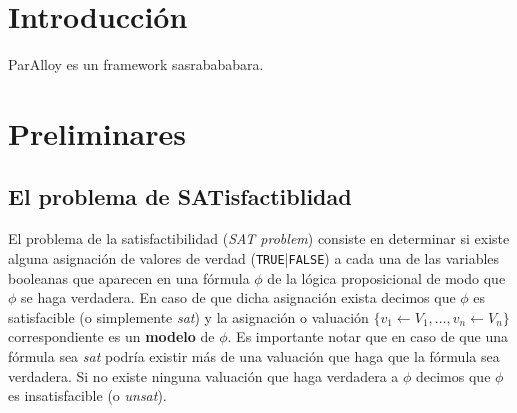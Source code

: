 \documentclass[a4paper, 11pt, twoside]{tesis}
\begin{document}
\def\autor{Ignacio Vissani}
\def\titulo{Acelerando ParAlloy mediante la reutilización de cláusulas
aprendidas} 
\def\runtitulo{Acelerando ParAlloy mediante la reutilización de cláusulas
aprendidas}
\def\runtitle{Speeding up ParAlloy reusing learnt clauses}
\def\director{Carlos Gustavo López Pombo}
\def\codirector{Nicolás Leandro Rosner}
\def\lugar{Buenos Aires, 2012}


\frontmatter
\pagestyle{empty}


\cleardoublepage


\cleardoublepage

\cleardoublepage

\cleardoublepage
\tableofcontents

\mainmatter
\pagestyle{headings}

\chapter{Introducción}
ParAlloy \cite{rosner:abz10} es un framework sasrabababara.

\chapter{Preliminares}

\newcommand{\true}{\texttt{TRUE}\xspace}
\newcommand{\false}{\texttt{FALSE}\xspace}
\newcommand{\sat}{\emph{sat}\xspace}
\newcommand{\unsat}{\emph{unsat}\xspace}
\newcommand{\cnf}{\texttt{\textbf{CNF}}\xspace}
\newcommand{\npc}{\textbf{NP-Complete}\xspace}
\newcommand{\bt}{\emph{backtracking}}

\newcommand{\disj}[1]{\ensuremath{[#1]}}
\newcommand{\conj}[1]{\ensuremath{\{#1\}}}

\section{El problema de SATisfactiblidad}

El problema de la satisfactibilidad (\emph{SAT problem}) consiste en determinar
si existe alguna asignación de valores de verdad (\true|\false) a cada una de
las variables booleanas que aparecen en una fórmula $\phi$ de la lógica
proposicional de modo que $\phi$ se haga verdadera. En caso de que dicha
asignación exista decimos que $\phi$ es satisfacible (o simplemente \sat) y la
asignación o valuación $\{ v_1 \leftarrow V_1, \ldots, v_n \leftarrow V_n \}$
correspondiente es un \textbf{modelo} de $\phi$. Es importante notar que en caso
de que una fórmula sea \sat podría existir más de una valuación que haga que la
fórmula sea verdadera. Si no existe ninguna valuación que haga verdadera a
$\phi$ decimos que $\phi$ es insatisfacible (o \unsat).
\end{document}
